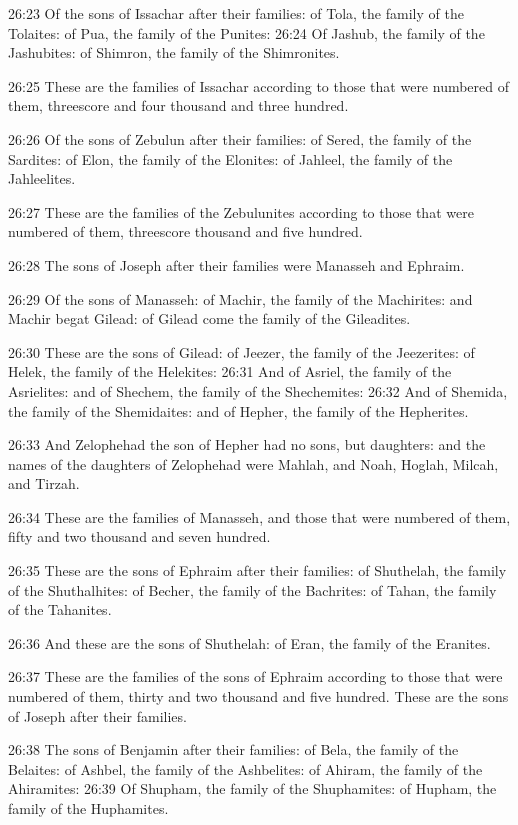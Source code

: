 26:23 Of the sons of Issachar after their families: of Tola, the
family of the Tolaites: of Pua, the family of the Punites: 26:24 Of
Jashub, the family of the Jashubites: of Shimron, the family of the
Shimronites.

26:25 These are the families of Issachar according to those that were
numbered of them, threescore and four thousand and three hundred.

26:26 Of the sons of Zebulun after their families: of Sered, the
family of the Sardites: of Elon, the family of the Elonites: of
Jahleel, the family of the Jahleelites.

26:27 These are the families of the Zebulunites according to those
that were numbered of them, threescore thousand and five hundred.

26:28 The sons of Joseph after their families were Manasseh and
Ephraim.

26:29 Of the sons of Manasseh: of Machir, the family of the
Machirites: and Machir begat Gilead: of Gilead come the family of the
Gileadites.

26:30 These are the sons of Gilead: of Jeezer, the family of the
Jeezerites: of Helek, the family of the Helekites: 26:31 And of
Asriel, the family of the Asrielites: and of Shechem, the family of
the Shechemites: 26:32 And of Shemida, the family of the Shemidaites:
and of Hepher, the family of the Hepherites.

26:33 And Zelophehad the son of Hepher had no sons, but daughters: and
the names of the daughters of Zelophehad were Mahlah, and Noah,
Hoglah, Milcah, and Tirzah.

26:34 These are the families of Manasseh, and those that were numbered
of them, fifty and two thousand and seven hundred.

26:35 These are the sons of Ephraim after their families: of
Shuthelah, the family of the Shuthalhites: of Becher, the family of
the Bachrites: of Tahan, the family of the Tahanites.

26:36 And these are the sons of Shuthelah: of Eran, the family of the
Eranites.

26:37 These are the families of the sons of Ephraim according to those
that were numbered of them, thirty and two thousand and five hundred.
These are the sons of Joseph after their families.

26:38 The sons of Benjamin after their families: of Bela, the family
of the Belaites: of Ashbel, the family of the Ashbelites: of Ahiram,
the family of the Ahiramites: 26:39 Of Shupham, the family of the
Shuphamites: of Hupham, the family of the Huphamites.

